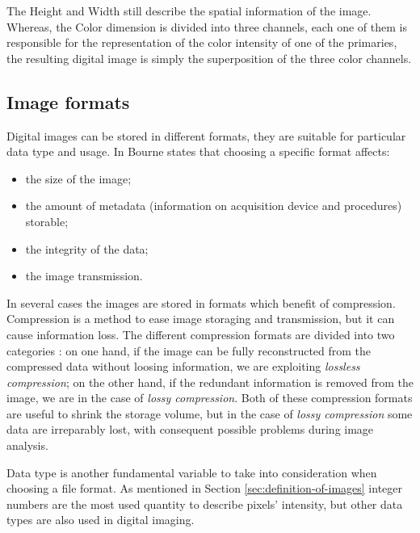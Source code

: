 \documentclass[../main.tex]{subfiles}
\begin{document}
The Height and Width still describe the spatial information of the image. Whereas, the Color dimension is divided into three channels, each one of them is responsible for the representation of the color intensity of one of the primaries, the resulting digital image is simply the superposition of the three color channels.




\subsection{Image formats}

Digital images can be stored in different formats, they are suitable for particular data type and usage.  In \cite{bourne2010fundamentals} Bourne states that choosing a specific format affects:
\begin{itemize}
    \item the size of the image;
    \item the amount of metadata (information on acquisition device and procedures) storable;
    \item the integrity of the data;
    \item the image transmission.
\end{itemize}

In several cases the images are stored in formats which benefit of compression. Compression is a method to ease image storaging and transmission, but it can cause information loss. The different compression formats are divided into two categories \cite{digital_processing_matlab}:
on one hand, if the image can be fully reconstructed from the compressed data without loosing information, we are exploiting \textit{lossless compression}; on the other hand, if the redundant information is removed from the image, we are in the case of \textit{lossy compression}.
Both of these compression formats are useful to shrink the storage volume, but in the case of \textit{lossy compression} some data are irreparably lost, with consequent possible problems during image analysis.

Data type is another fundamental variable to take into consideration when choosing a file format. As mentioned in Section \ref{sec:definition-of-images} integer numbers are the most used quantity to describe pixels' intensity, but other data types are also used in digital imaging. 
\end{document}
